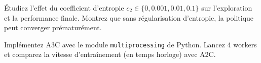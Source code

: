 \begin{exercice}[Entropie]
\'Etudiez l'effet du coefficient d'entropie $c_2 \in \{0, 0.001, 0.01, 0.1\}$
sur l'exploration et la performance finale. Montrez que sans r\'egularisation
d'entropie, la politique peut converger pr\'ematur\'ement.
\end{exercice}

\begin{exercice}[A3C asynchrone]
Impl\'ementez A3C avec le module \texttt{multiprocessing} de Python. Lancez
4 workers et comparez la vitesse d'entra\^inement (en temps horloge) avec A2C.
\end{exercice}
